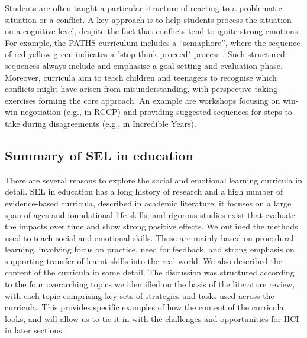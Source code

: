 \documentclass[prodmode,acmtochi]{acmsmall}
\begin{document}
                
                Students are often taught a particular structure of reacting to a problematic situation or a conflict.
%
A key approach is to help students process the situation on a cognitive level, despite the fact that conflicts tend to ignite strong emotions. For example, the PATHS curriculum includes a ``semaphore'', where the sequence of red-yellow-green indicates a "stop-think-proceed" process \cite{Kam2004,Domitrovich2007}. Such structured sequences always include and emphasise a goal setting and evaluation phase. Moreover, curricula aim to teach children and teenagers to recognise which conflicts might have arisen from misunderstanding, with perspective taking exercises forming the core approach. An example are workshops focusing on win-win negotiation (e.g., in RCCP) and providing suggested sequences for steps to take during disagreements (e.g., in Incredible Years).

\subsection{Summary of SEL in education}
There are several reasons to explore the social and emotional learning curricula in detail. SEL in education has a long history of research and a high number of evidence-based curricula, described in academic literature; it focuses on a large span of ages and foundational life skills; and  rigorous studies exist that evaluate the impacts over time and show strong positive effects. 
         We outlined the methods used to teach social and emotional skills. These are mainly based on procedural learning, involving focus on practice, need for feedback, and strong emphasis on supporting transfer of learnt skills into the real-world.
%
        We also described the content of the curricula in some detail. The discussion was structured according to the four overarching topics we identified on the basis of the literature review, with each topic comprising key sets of strategies and tasks used across the curricula. This provides specific examples of how the content of the curricula looks, and will allow us to tie it in with the challenges and opportunities for HCI in later sections.



\end{document}

